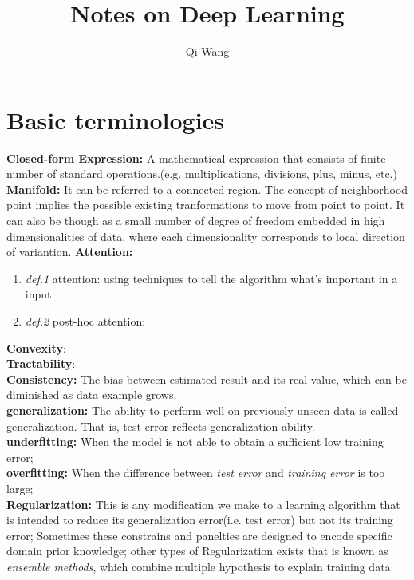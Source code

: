 \documentclass{article}
\author{Qi Wang}
\title{Notes on Deep Learning}
\begin{document}
\maketitle
\section{Basic terminologies}
\textbf{Closed-form Expression:} A mathematical expression that consists of finite number of standard operations.(e.g. multiplications, divisions, plus, minus, etc.)
\textbf{Manifold:}
It can be referred to a connected region. The concept of neighborhood point implies the possible existing tranformations to move from point to point. It can also be though as a small number of degree of freedom embedded in high dimensionalities of data, where each dimensionality corresponds to local direction of variantion. 
\textbf{Attention:}
\begin{enumerate}
\item \textit{def.1} attention: using techniques to tell the algorithm what's important in a input.
\item \textit{def.2} post-hoc attention:
\end{enumerate}
\textbf{Convexity}:\\
\textbf{Tractability}:\\
\textbf{Consistency:} The bias between estimated result and its real value, which can be diminished as data example grows.\\
\textbf{generalization:} The ability to perform well on previously unseen data is called generalization. That is, test error reflects generalization ability.\\
\textbf{underfitting:} When the model is not able to obtain a sufficient low training error;\\
\textbf{overfitting:} When the difference between \textit{test error} and \textit{training error} is too large;\\
\textbf{Regularization:} This is any modification we make to a learning algorithm that is intended to reduce its generalization error(i.e. test error) but not its training error; Sometimes these constrains and panelties are designed to encode specific domain prior knowledge; other types of Regularization exists that is known as \textit{ensemble methods}, which combine multiple hypothesis to explain training data.\\
\end{document}

